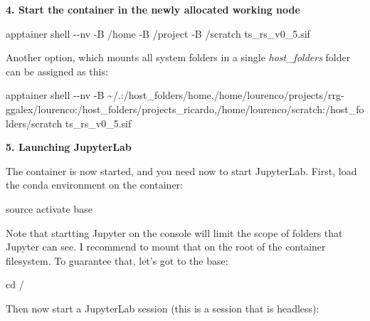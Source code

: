 \documentclass[
]{book}
\newenvironment{Shaded}{\begin{snugshade}}{\end{snugshade}}
\newcommand{\AttributeTok}[1]{\textcolor[rgb]{0.13,0.29,0.53}{#1}}
\newcommand{\BuiltInTok}[1]{#1}
\newcommand{\ExtensionTok}[1]{#1}
\newcommand{\FunctionTok}[1]{\textcolor[rgb]{0.13,0.29,0.53}{\textbf{#1}}}
\newcommand{\NormalTok}[1]{#1}
\newcommand{\VariableTok}[1]{\textcolor[rgb]{0.00,0.00,0.00}{#1}}
\begin{document}
\textbf{4. Start the container in the newly allocated working node}

\begin{Shaded}
\begin{Highlighting}[]
\ExtensionTok{apptainer}\NormalTok{ shell }\AttributeTok{{-}{-}nv} \AttributeTok{{-}B}\NormalTok{ /home }\AttributeTok{{-}B}\NormalTok{ /project }\AttributeTok{{-}B}\NormalTok{ /scratch ts\_rs\_v0\_5.sif}
\end{Highlighting}
\end{Shaded}

Another option, which mounts all system folders in a single \emph{host\_folders} folder can be assigned as this:

\begin{Shaded}
\begin{Highlighting}[]
\ExtensionTok{apptainer}\NormalTok{ shell }\AttributeTok{{-}{-}nv} \AttributeTok{{-}B}\NormalTok{ \textasciitilde{}/.:/host\_folders/home,/home/lourenco/projects/rrg{-}ggalex/lourenco:/host\_folders/projects\_ricardo,/home/lourenco/scratch:/host\_folders/scratch ts\_rs\_v0\_5.sif}
\end{Highlighting}
\end{Shaded}

\textbf{5. Launching JupyterLab}

The container is now started, and you need now to start JupyterLab. First, load the conda environment on the container:

\begin{Shaded}
\begin{Highlighting}[]
\BuiltInTok{source}\NormalTok{ activate base}
\end{Highlighting}
\end{Shaded}

Note that startting Jupyter on the console will limit the scope of folders that Jupyter can see. I recommend to mount that on the root of the container filesystem. To guarantee that, let's got to the base:

\begin{Shaded}
\begin{Highlighting}[]
\BuiltInTok{cd}\NormalTok{ /}
\end{Highlighting}
\end{Shaded}

Then now start a JupyterLab session (this is a session that is headless):

\begin{Shaded}
\end{Shaded}
\end{document}
